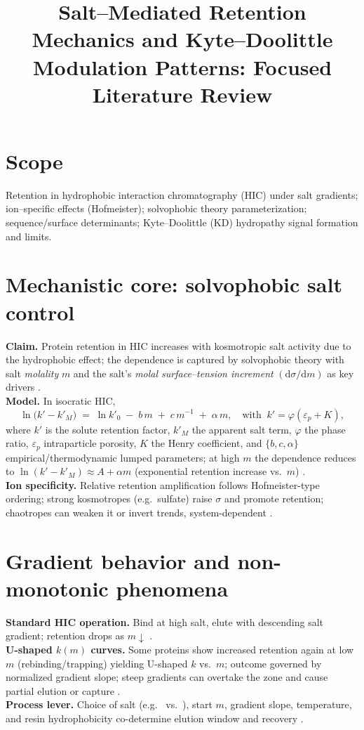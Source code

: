\documentclass[11pt]{article}
\title{Salt–Mediated Retention Mechanics and Kyte–Doolittle Modulation Patterns: Focused Literature Review}
\date{}
\begin{document}
\maketitle

\section*{Scope}
Retention in hydrophobic interaction chromatography (HIC) under salt gradients; ion–specific effects (Hofmeister); solvophobic theory parameterization; sequence/surface determinants; Kyte–Doolittle (KD) hydropathy signal formation and limits.

\section{Mechanistic core: solvophobic salt control}
\textbf{Claim.} Protein retention in HIC increases with kosmotropic salt activity due to the hydrophobic effect; the dependence is captured by solvophobic theory with salt \emph{molality} $m$ and the salt’s \emph{molal surface–tension increment} $\left(\mathrm{d}\sigma/\mathrm{d}m\right)$ as key drivers \cite{Melander1977,Melander1984}. \\
\textbf{Model.} In isocratic HIC,
\begin{equation}
\ln\!\big(k' - k'_M\big) \;=\; \ln k'_0 \;-\; b\,m \;+\; c\,m^{-1} \;+\; \alpha\, m,
\quad \text{with}\;\; k'=\varphi(\varepsilon_p + K),
\label{eq:solvophobic}
\end{equation}
where $k'$ is the solute retention factor, $k'_M$ the apparent salt term, $\varphi$ the phase ratio, $\varepsilon_p$ intraparticle porosity, $K$ the Henry coefficient, and $\{b,c,\alpha\}$ empirical/thermodynamic lumped parameters; at high $m$ the dependence reduces to $\ln(k'-k'_M)\approx A+\alpha m$ (exponential retention increase vs.\ $m$) \cite{Melander1984,Creasy2018}. \\
\textbf{Ion specificity.} Relative retention amplification follows Hofmeister-type ordering; strong kosmotropes (e.g.\ sulfate) raise $\sigma$ and promote retention; chaotropes can weaken it or invert trends, system-dependent \cite{Gregory2022,Melander1977}.

\section{Gradient behavior and non-monotonic phenomena}
\textbf{Standard HIC operation.} Bind at high salt, elute with descending salt gradient; retention drops as $m\downarrow$ \cite{Queiroz2001}. \\
\textbf{U-shaped $k(m)$ curves.} Some proteins show increased retention again at low $m$ (rebinding/trapping) yielding U-shaped $k$ vs.\ $m$; outcome governed by normalized gradient slope; steep gradients can overtake the zone and cause partial elution or capture \cite{Creasy2018}. \\
\textbf{Process lever.} Choice of salt (e.g.\  vs.\ ), start $m$, gradient slope, temperature, and resin hydrophobicity co-determine elution window and recovery \cite{Creasy2018,LCGC2019}.
\end{document}
